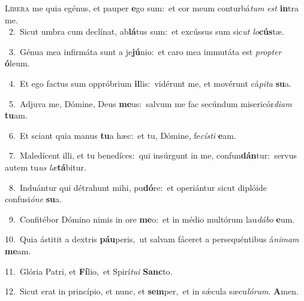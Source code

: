 \lettrine{\initial\textcolor{\initialcolor}{L}}{íbera} me quia egénus, et pauper \textbf{e}\-go sum:~\star et cor meum conturbá\textit{tum} \textit{est} \textbf{in}\-tra me.\\
{\numbfont\textcolor{\numbcolor}{~2.}}~Sicut umbra cum declínat, ab\-\textbf{lá}\-tus sum:~\star et excússus sum sic\textit{ut} \textit{lo}\-\textbf{cús}tæ.\par
{\numbfont\textcolor{\numbcolor}{~3.}}~Génua mea infirmáta sunt a je\-\textbf{jú}\-nio:~\star et caro mea immutáta est \textit{prop}\-\textit{ter} \textbf{ó}\-leum.\par
{\numbfont\textcolor{\numbcolor}{~4.}}~Et ego factus sum oppróbrium \textbf{il}\-lis:~\star vidérunt me, et movérunt cá\-\textit{pi}\-\textit{ta} \textbf{su}\-a.\par
{\numbfont\textcolor{\numbcolor}{~5.}}~Adjuva me, Dómine, Deus \textbf{me}\-us:~\star salvum me fac secúndum misericór\-\textit{di}\-\textit{am} \textbf{tu}\-am.\par
{\numbfont\textcolor{\numbcolor}{~6.}}~Et sciant quia manus \textbf{tu}\-a hæc:~\star et tu, Dómine, fe\-\textit{cís}\-\textit{ti} \textbf{e}\-am.\par
{\numbfont\textcolor{\numbcolor}{~7.}}~Maledícent illi, et tu benedíces:~\dagger qui insúrgunt in me, confun\-\textbf{dán}\-tur:~\star servus autem tu\textit{us} \textit{læ}\-\textbf{tá}bitur.\par
{\numbfont\textcolor{\numbcolor}{~8.}}~Induántur qui détrahunt mihi, pu\-\textbf{dó}\-re:~\star et operiántur sicut diplóide confusi\-\textit{ó}\-\textit{ne} \textbf{su}\-a.\par
{\numbfont\textcolor{\numbcolor}{~9.}}~Confitébor Dómino nimis in ore \textbf{me}\-o:~\star et in médio multórum lau\-\textit{dá}\-\textit{bo} \textbf{e}\-um.\par
{\numbfont\textcolor{\numbcolor}{10.}}~Quia ástitit a dextris \textbf{páu}\-peris,~\star ut salvam fáceret a persequéntibus á\-\textit{ni}\-\textit{mam} \textbf{me}\-am.\par
{\numbfont\textcolor{\numbcolor}{11.}}~Glória Patri, et \textbf{Fí}\-lio,~\star et Spirí\-\textit{tu}\-\textit{i} \textbf{Sanc}\-to.\par
{\numbfont\textcolor{\numbcolor}{12.}}~Sicut erat in princípio, et nunc, et \textbf{sem}\-per,~\star et in sǽcula sæcu\-\textit{ló}\-\textit{rum}. \textbf{A}\-men.\par
